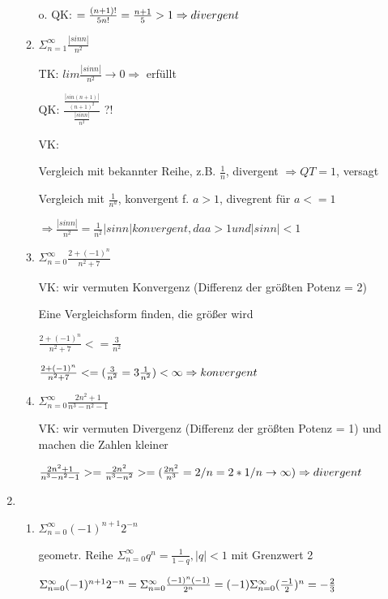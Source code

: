 \documentclass[12pt,a4paper]{scrreprt}
\begin{document}
\begin{enumerate}
\begin{enumerate}
o. QK: $= \frac{(n+1)!}{5 n!} = \frac{n+1}{5} > 1 \\
\Rightarrow divergent$

\item $\Sigma_{n=1}^{\infty} \frac{|sin n|}{n^2}$

TK: $lim \frac{|sin n|}{n^2} \rightarrow 0 \Rightarrow$ erfüllt

QK: $\frac{ \frac{|sin (n+1)|}{(n+1)^2} }{ \frac{|sin n|}{n^2} }$ ?!

VK:

Vergleich mit bekannter Reihe, z.B. $\frac{1}{n}$, divergent $\Rightarrow QT=1$, versagt

Vergleich mit $\frac{1}{n^a}$, konvergent f. $a>1$, divegrent für $a<=1$

$\Rightarrow \frac{|sin n|}{n^2} = \frac{1}{n^2} |sin n| konvergent, da a>1 und |sin n| < 1$

\item $\Sigma_{n=0}^{\infty} \frac{2+(-1)^n}{n^2+7}$

VK: wir vermuten Konvergenz (Differenz der größten Potenz = 2)

Eine Vergleichsform finden, die größer wird

$\frac{2+(-1)^n}{n^2+7} <= \frac{3}{ n^2 }$

$\frac{2+(-1)^n}{n^2+7} <= ( \frac{3}{ n^2 } = 3 \frac{1}{ n^2 } ) < \infty \\
\Rightarrow konvergent$

\item $\Sigma_{n=0}^{\infty} \frac{2n^2 +1}{n^3-n^2-1}$

VK: wir vermuten Divergenz (Differenz der größten Potenz = 1) und machen die Zahlen kleiner

$\frac{2n^2 +1}{n^3-n^2-1} >= \frac{2n^2}{n^3-n^2}  >= ( \frac{2n^2}{n^3} = 2/n = 2*1/n \rightarrow \infty) \\
\Rightarrow divergent$

\end{enumerate}

\item 

\begin{enumerate}

\item $\Sigma_{n=0}^{\infty} (-1)^{n+1} 2^{-n}$

geometr. Reihe $\Sigma_{n=0}^{\infty} q^n  = \frac{1}{1-q}, |q|<1$ mit Grenzwert 2

$ \Sigma_{n=0}^{\infty} (-1)^{n+1} 2^{-n}	\\
 =  \Sigma_{n=0}^{\infty} \frac{(-1)^{n}(-1)}{ 2^{n} }	\\
 =  (-1) \Sigma_{n=0}^{\infty} (\frac{-1}{ 2 })^{n} = -\frac{2}{3}$
 

\end{enumerate}
\end{enumerate}
\end{document}
